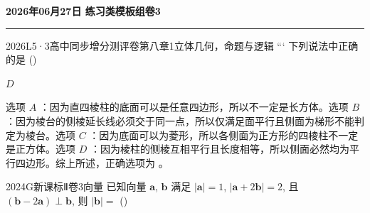 \documentclass[12pt,UTF-8,a4paper]{ctexart}
\newcommand{\mytitle}{}
\numberwithin{figure}{section}
\theoremstyle{mystyle}
\theoremstyle{mystylekaishu}
\theoremstyle{mystyle}
\numberwithin{xiti}{section}
\begin{document}
\thispagestyle{plain} %
\renewcommand{\mytitle}{2026年06月27日 练习类模板组卷3}

\begin{center}
  {\Huge\bfseries\color{structure} \mytitle}
  \vspace{0.5em}
  
  \textcolor{structure}{\rule{\linewidth}{1.5pt}}
\end{center}
\vspace{1em}


\begin{problem}{2026}{L}{5·3高中同步增分测评卷第八章}{1}{立体几何，命题与逻辑}
```
下列说法中正确的是 (\hspace{1cm})
\begin{choices}
\end{choices}
\end{problem}

\begin{answer}
$D$
\end{answer}

\begin{solutions}
选项 $A$ ：因为直四棱柱的底面可以是任意四边形，所以不一定是长方体。选项 $B$ ：因为棱台的侧棱延长线必须交于同一点，所以仅满足面平行且侧面为梯形不能判定为棱台。选项 $C$ ：因为底面可以为菱形，所以各侧面为正方形的四棱柱不一定是正方体。选项 $D$ ：因为棱柱的侧棱互相平行且长度相等，所以侧面必然均为平行四边形。综上所述，正确选项为 。
\end{solutions}


\begin{problem}{2024}{G}{新课标Ⅱ卷}{3}{向量}
已知向量 $\boldsymbol{a}$, $\boldsymbol{b}$ 满足 $|\boldsymbol{a}|=1$, $|\boldsymbol{a}+2\boldsymbol{b}|=2$, 且 $(\boldsymbol{b}-2\boldsymbol{a}) \perp \boldsymbol{b}$, 则 $|\boldsymbol{b}|=$ (\hspace{1cm})
\begin{choices}
\end{choices}
\end{problem}
\end{document}
